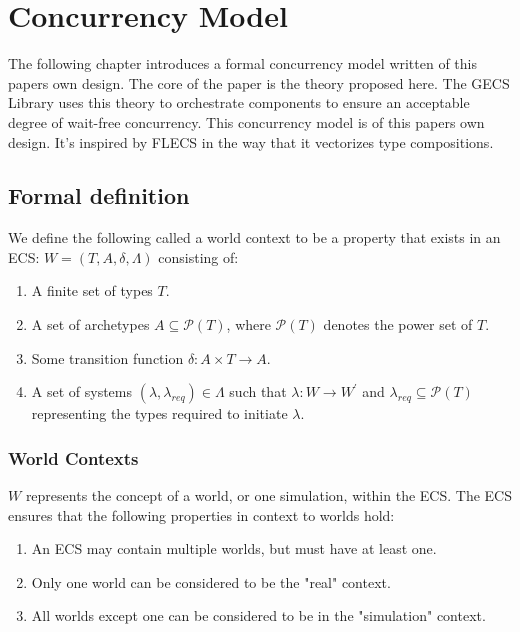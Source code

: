 
\section{Concurrency Model}
\label{chap:2}
The following chapter introduces a formal concurrency model written of this papers own design. The core of the paper is the theory proposed here. The GECS Library uses this theory to orchestrate components to ensure an acceptable degree of wait-free concurrency. This concurrency model is of this papers own design. It's inspired by FLECS in the way that it vectorizes type compositions.

\subsection{Formal definition} \label{section:formal_definition}
We define the following called a world context to be a property that exists in an ECS: $W = (T, A, \delta, \Lambda)$ consisting of:
\begin{enumerate}
    \item A finite set of types $T$.
    \item A set of archetypes $A \subseteq \mathcal{P}(T)$, where $\mathcal{P}(T)$ denotes the power set of $T$.
    \item Some transition function $\delta : A \times T \rightarrow A$.
    \item A set of systems $(\lambda, \lambda_{req}) \in \Lambda$ such that $\lambda : W \rightarrow W^\prime$ and $\lambda_{req} \subseteq \mathcal{P}(T)$ representing the types required to initiate $\lambda$.
\end{enumerate}

\subsubsection{World Contexts}
$W$ represents the concept of a world, or one simulation, within the ECS. The ECS ensures that the following properties in context to worlds hold:

\begin{enumerate}
    \item An ECS may contain multiple worlds, but must have at least one.
    \item Only one world can be considered to be the "real" context.
    \item All worlds except one can be considered to be in the "simulation" context.
\end{enumerate}

